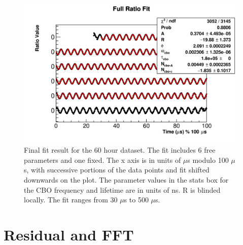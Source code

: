\begin{figure}[H]
	\centering
	\includegraphics[width=\textwidth]{ratioCBO_moduloPlot}
    \caption[ratioCBO_moduloPlot]{Final fit result for the 60 hour dataset. The fit includes 6 free parameters and one fixed. The x axis is in units of $\mu$s modulo 100 $\mu$s, with successive portions of the data points and fit shifted downwards on the plot. The parameter values in the stats box for the CBO frequency and lifetime are in units of ns. R is blinded locally. The fit ranges from 30 $\mu$s to 500 $\mu$s.}
    \label{fig:ratioCBO_moduloPlot}
\end{figure}



\section{Residual and FFT}

